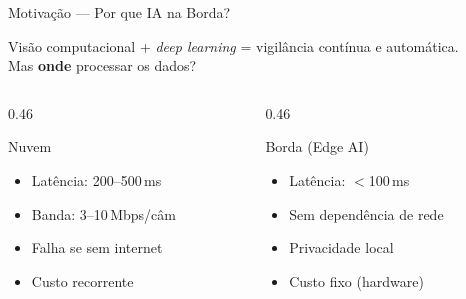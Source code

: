 \begin{frame}{Motiva\c{c}\~{a}o --- Por que IA na Borda?}
  \vfill

  \begin{center}
    {\small Vis\~{a}o computacional + \textit{deep learning} = vigil\^{a}ncia cont\'{i}nua e autom\'{a}tica.\\[2pt]
    Mas \textbf{onde} processar os dados?}
  \end{center}

  \vspace{3mm}

  \begin{columns}[T]
    \begin{column}{0.46\textwidth}
      {
      \begin{block}{\centering Nuvem}
        \begin{itemize}\small
          \item[\color{skipcolor}$\boldsymbol{\times}$] Lat\^{e}ncia: 200--500\,ms
          \item[\color{skipcolor}$\boldsymbol{\times}$] Banda: 3--10\,Mbps/c\^{a}m
          \item[\color{skipcolor}$\boldsymbol{\times}$] Falha se sem internet
          \item[\color{skipcolor}$\boldsymbol{\times}$] Custo recorrente
        \end{itemize}
      \end{block}
      }
    \end{column}
    \begin{column}{0.46\textwidth}
      {
      \begin{block}{\centering Borda (Edge AI)}
        \begin{itemize}\small
          \item[\color{headcolor}$\boldsymbol{\checkmark}$] Lat\^{e}ncia: $<$100\,ms
          \item[\color{headcolor}$\boldsymbol{\checkmark}$] Sem depend\^{e}ncia de rede
          \item[\color{headcolor}$\boldsymbol{\checkmark}$] Privacidade local
          \item[\color{headcolor}$\boldsymbol{\checkmark}$] Custo fixo (hardware)
        \end{itemize}
      \end{block}
      }
    \end{column}
  \end{columns}


\end{frame}
